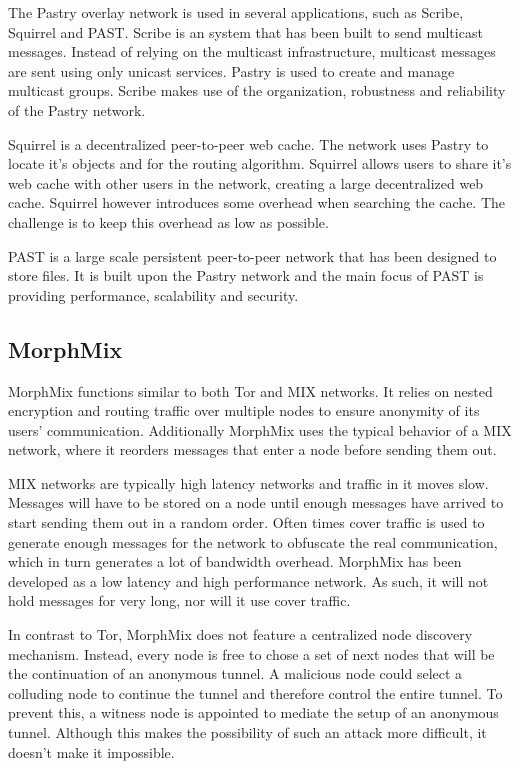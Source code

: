 \documentclass{article}
\begin{document}
		The Pastry overlay network is used in several applications, such as Scribe, Squirrel and PAST. Scribe is an system that has been built to send multicast messages. Instead of relying on the multicast infrastructure, multicast messages are sent using only unicast services. Pastry is used to create and manage multicast groups. Scribe makes use of the organization, robustness and reliability of the Pastry network.

		Squirrel is a decentralized peer-to-peer web cache. The network uses Pastry to locate it's objects and for the routing algorithm. Squirrel allows users to share it's web cache with other users in the network, creating a large decentralized web cache. Squirrel however introduces some overhead when searching the cache. The challenge is to keep this overhead as low as possible.

		PAST is a large scale persistent peer-to-peer network that has been designed to store files. It is built upon the Pastry network and the main focus of PAST is providing performance, scalability and security.
			
	\subsection{MorphMix} %
		MorphMix \cite{rennhard2002introducing} functions similar to both Tor and MIX networks. It relies on nested encryption and routing traffic over multiple nodes to ensure anonymity of its users' communication. Additionally MorphMix uses the typical behavior of a MIX network, where it reorders messages that enter a node before sending them out.
		
		MIX networks are typically high latency networks and traffic in it moves slow. Messages will have to be stored on a node until enough messages have arrived to start sending them out in a random order. Often times cover traffic is used to generate enough messages for the network to obfuscate the real communication, which in turn generates a lot of bandwidth overhead. MorphMix has been developed as a low latency and high performance network. As such, it will not hold messages for very long, nor will it use cover traffic.
		
		In contrast to Tor, MorphMix does not feature a centralized node discovery mechanism. Instead, every node is free to chose a set of next nodes that will be the continuation of an anonymous tunnel. A malicious node could select a colluding node to continue the tunnel and therefore control the entire tunnel. To prevent this, a witness node is appointed to mediate the setup of an anonymous tunnel. Although this makes the possibility of such an attack more difficult, it doesn't make it impossible.
		
\end{document}
